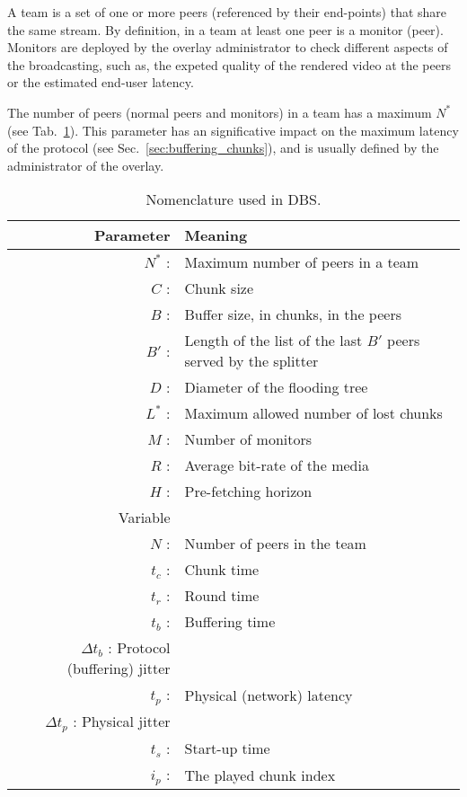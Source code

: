 

\label{sec:team_def}

A team is a set of one or more peers (referenced by their end-points)
that share the same stream. By definition, in a team at least one peer
is a \gls{monitor} (peer). Monitors are deployed by the overlay
administrator to check different aspects of the broadcasting, such as,
the expeted quality of the rendered video at the peers or the
estimated end-user latency.

The number of peers (normal peers and monitors) in a team has a
maximum $N^*$ (see Tab.~\ref{tab:DBS_nomenclature}). This parameter
has an significative impact on the maximum latency of the protocol (see
Sec.~\ref{sec:buffering_chunks}), and is usually defined by the
administrator of the overlay.

\begin{table}[t]
  \centering
  \begin{tabular}{rl}
    Parameter & Meaning \\
    \hline
    $N^*$ :  & Maximum number of peers in a team \\
    $C$ :    & Chunk size \\
    $B$ :    & Buffer size, in chunks, in the peers \\
    $B'$ :   & Length of the list of the last $B'$ peers served by the splitter \\ 
    $D$ :    & Diameter of the flooding tree \\
    $L^*$ :  & Maximum allowed number of lost chunks \\
    $M$ :    & Number of monitors \\
    $R$ :    & Average bit-rate of the media \\
    $H$ :    & Pre-fetching horizon \\
    Variable & \\
    \hline
    $N$ :    & Number of peers in the team \\
    $t_c$ :  & Chunk time \\
    $t_r$ :  & Round time \\
    $t_b$ :  & Buffering time \\
    $\Delta t_b$ : Protocol (buffering) jitter \\ 
    $t_p$ :  & Physical (network) latency \\
    $\Delta t_p$ : Physical jitter \\
    $t_s$ :  & Start-up time \\
    $i_p$ :  & The played chunk index 
  \end{tabular}
  \caption{Nomenclature used in DBS.} %
  \label{tab:DBS_nomenclature}
\end{table}


